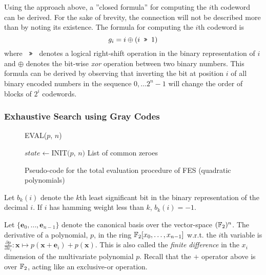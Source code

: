 Using the approach above, a ''closed formula'' for computing the $i$th codeword can be derived. For the sake of brevity, the connection will not be described more than by noting its existence. The formula for computing the $i$th codeword is
$$
    g_i = i \oplus (i \texttt{ >> } 1)
$$
where $\texttt{ >> }$ denotes a logical right-shift operation in the binary representation of $i$ and $\oplus$ denotes the bit-wise \textit{xor} operation between two binary numbers. This formula can be derived by observing that inverting the bit at position $i$ of all binary encoded numbers in the sequence $0,\dots 2^{n} - 1$ will change the order of blocks of $2^i$ codewords.

\subsubsection{Exhaustive Search using Gray Codes} \label{sec:prereq:fes:exh_g_code}
\begin{figure}[t]
    \begin{alg}
        \caption{EVAL($p$, $n$)}\label{alg:fes_eval}
        $state \gets \text{INIT($p$, $n$)}$\;
        \Return List of common zeroes
    \end{alg}
    \caption{Pseudo-code for the total evaluation procedure of FES (quadratic polynomials)}
\end{figure}

\begin{defn}[] \label{sec:prereq:def:bk}
    Let $b_k(i)$ denote the $k$th least significant bit in the binary representation of the decimal $i$. If $i$ has hamming weight less than $k$, $b_k(i) = -1$.
\end{defn}

\begin{defn}[Derivatives] \label{sec:prereq:deriv}
    Let $\{\mathbf{e}_0, \dots, \mathbf{e}_{n-1}\}$ denote the canonical basis over the vector-space $(\mathbb{F}_2)^n$. The derivative of a polynomial, $p$, in the ring $\mathbb{F}_2[x_0,\dots,x_{n-1}]$ w.r.t. the $i$th variable is $\frac{\partial p}{\partial x_i} : \mathbf{x} \mapsto p(\mathbf{x} + \mathbf{e}_i) + p(\mathbf{x})$. This is also called the \textit{finite difference} in the $x_i$ dimension of the multivariate polynomial $p$. Recall that the $+$ operator above is over $\mathbb{F}_2$, acting like an exclusive-or operation.
\end{defn} 

